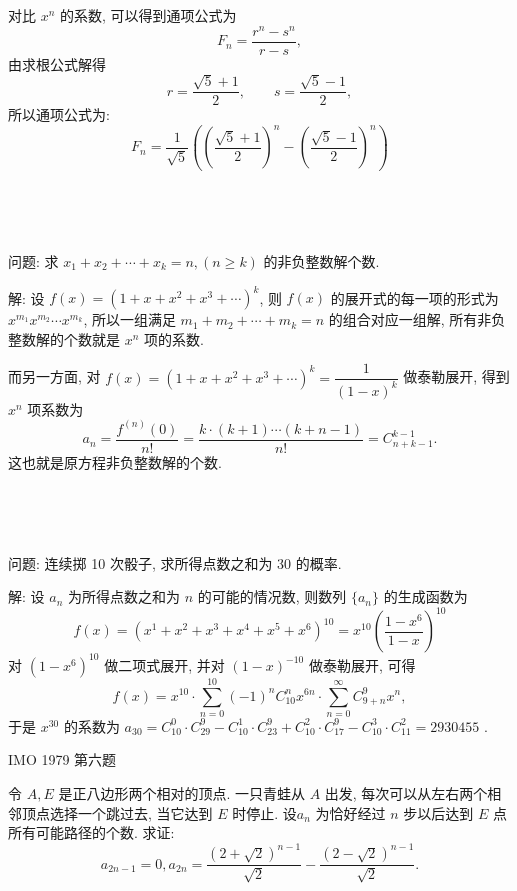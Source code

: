 对比 $x^n$ 的系数, 可以得到通项公式为 
$$F_n = \dfrac{r^n - s^n}{r-s},$$ 
由求根公式解得 
$$r=\dfrac{\sqrt{5}+1}{2}, \qquad s=\dfrac{\sqrt{5}-1}{2},$$ 
所以通项公式为:
\[F_n = \frac{1}{\sqrt{5}}\left( \left(\frac{\sqrt{5}+1}{2} \right)^n - \left(\frac{\sqrt{5}-1}{2} \right)^n \right)\]

~

~

\noindent 问题: 求 $x_1 + x_2 + \cdots + x_k = n, (n\ge k)$ 的非负整数解个数.

解: 设 $f(x) = (1+x+x^2+x^3+\cdots)^k$, 则 $f(x)$ 的展开式的每一项的形式为 $x^{m_1}x^{m_2}\cdots x^{m_k}$, 所以一组满足 $m_1+m_2+\cdots+m_k=n$ 的组合对应一组解, 所有非负整数解的个数就是 $x^n$ 项的系数.

而另一方面, 对 $ f(x) = (1+x+x^2+x^3+\cdots)^k = \dfrac{1}{(1-x)^k}$ 做泰勒展开, 得到 $x^n$ 项系数为
\[
a_n = \frac{f^{(n)}(0)}{n!} = \frac{k\cdot(k+1)\cdots(k+n-1)}{n!} = C^{k-1}_{n+k-1}.
\]
这也就是原方程非负整数解的个数.

~

~

\noindent 问题: 连续掷 10 次骰子, 求所得点数之和为 30 的概率.

解: 设 $a_n$ 为所得点数之和为 $n$ 的可能的情况数, 则数列 $\{a_n\}$ 的生成函数为
\[
f(x) = (x^1+x^2+x^3+x^4+x^5+x^6)^{10} = x^{10}\left(\frac{1-x^6}{1-x}\right)^{10}
\]
对 $(1-x^6)^{10}$ 做二项式展开, 并对 $(1-x)^{-10}$ 做泰勒展开, 可得
\[
f(x) = x^{10}\cdot\sum_{n=0}^{10}{(-1)^nC_{10}^nx^{6n}} \cdot \sum_{n=0}^{\infty}{C_{9+n}^9x^n},
\]
于是 $x^{30}$ 的系数为 $a_{30} = C_{10}^0\cdot C_{29}^9 - C_{10}^1\cdot C_{23}^9 + C_{10}^2\cdot C_{17}^9 - C_{10}^3\cdot C_{11}^2 = 2930455$ .


\newpage
\noindent IMO 1979 第六题

令 $A,E$ 是正八边形两个相对的顶点. 一只青蛙从 $A$ 出发, 每次可以从左右两个相邻顶点选择一个跳过去, 当它达到 $E$ 时停止. $设 a_n$ 为恰好经过 $n$ 步以后达到 $E$ 点所有可能路径的个数. 求证:
\[a_{2n-1} = 0, a_{2n} = \frac{(2+\sqrt{2})^{n-1}}{\sqrt{2}} - \frac{(2-\sqrt{2})^{n-1}}{\sqrt{2}} .\]
\begin{figure*}[htbp]
\centering
{}
\end{figure*}

